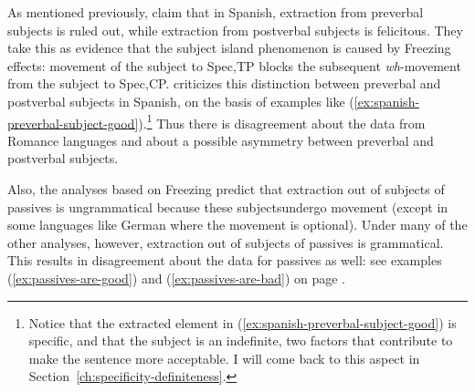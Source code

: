 As mentioned previously, \citet{Gallego.2007} claim that in Spanish, extraction from preverbal subjects is ruled out, while extraction from postverbal subjects is felicitous. They take this as evidence that the subject island phenomenon is caused by Freezing effects: movement of the subject to Spec,TP blocks the subsequent \emph{wh}-movement from the subject to Spec,CP. \citet{Jimenez-Fernandez.2009} criticizes this distinction between preverbal and postverbal subjects in Spanish, on the basis of examples like (\ref{ex:spanish-preverbal-subject-good}).\footnote{Notice that the extracted element in (\ref{ex:spanish-preverbal-subject-good}) is specific, and that the subject is an indefinite, two factors that contribute to make the sentence more acceptable. I will come back to this aspect in Section~\ref{ch:specificity-definiteness}.} Thus there is disagreement about the data from Romance languages and about a possible asymmetry between preverbal and postverbal subjects.

Also, the analyses based on Freezing predict that extraction out of subjects of passives is ungrammatical because these subjectsundergo movement (except in some languages like German where the movement is optional). Under many of the other analyses, however, extraction out of subjects of passives is grammatical. This results in disagreement about the data for passives as well: see examples (\ref{ex:passives-are-good}) and (\ref{ex:passives-are-bad}) on page \pageref{ex:passives-are-good}.


